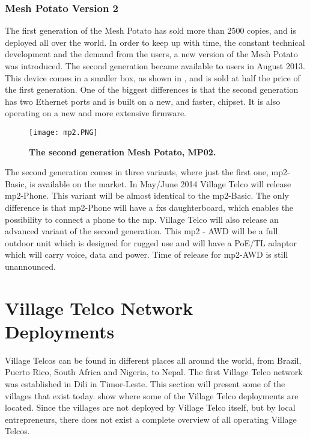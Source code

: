 \subsubsection{Mesh Potato Version 2}
The first generation of the Mesh Potato has sold more than 2500 copies, and is deployed all over the world. In order to keep up with time, the constant technical development and the demand from the users, a new version of the Mesh Potato was introduced. The second generation became available to users in August 2013. This device comes in a smaller box, as shown in , and is sold at half the price of the first generation. One of the biggest differences is that the second generation has two Ethernet ports and is built on a new, and faster, chipset. It is also operating on a new and more extensive firmware.

\begin{figure}[h!]
  \centering
      \texttt{[image: mp2.PNG]}
  \caption [MP02]{\textbf{The second generation Mesh Potato, MP02.}}
  \label{fig:MP02}
\end{figure}


The second generation comes in three variants, where just the first one, \gls{mp2}-Basic, is available on the market. In May/June 2014 Village Telco will release \gls{mp2}-Phone. This variant will be almost identical to the \gls{mp2}-Basic. The only difference is that \gls{mp2}-Phone will have a \gls{fxs} daughterboard, which enables the possibility to connect a phone to the \gls{mp}. Village Telco will also release an advanced variant of the second generation. This \gls{mp2} - AWD will be a full outdoor unit which is designed for rugged use and will have a PoE/TL adaptor which will carry voice, data and power. Time of release for \gls{mp2}-AWD is still unannounced. 


\section{Village Telco Network Deployments} \label{sec:deployments}
Village Telcos can be found in different places all around the world, from Brazil, Puerto Rico, South Africa and Nigeria, to Nepal. The first Village Telco network was established in Dili in Timor-Leste. This section will present some of the villages that exist today.  show where some of the Village Telco deployments are located. Since the villages are not deployed by Village Telco itself, but by local entrepreneurs, there does not exist a complete overview of all operating Village Telcos. 


